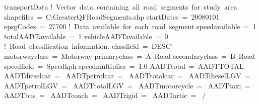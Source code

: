 \documentclass[letterpaper,10pt,english]{sphinxmanual}
\begin{document}
%
\begin{sphinxVerbatim}[commandchars=\\\{\}]
  \PYGZam{}transportData
    ! Vector data containing all road segments for study area
    shapefiles = \PYGZsq{}C:\PYGZbs{}GreaterQF\PYGZbs{}RoadSegments.shp\PYGZsq{}
    startDates = \PYGZsq{}2008\PYGZhy{}01\PYGZhy{}01\PYGZsq{}
    epsgCodes = 27700
    ! Data available for each road segment
    speed\PYGZus{}available = 1
    total\PYGZus{}AADT\PYGZus{}available = 1
    vehicle\PYGZus{}AADT\PYGZus{}available = 0
    ! Road classification information.
    class\PYGZus{}field = \PYGZsq{}DESC\PYGZus{}’
    motorway\PYGZus{}class = \PYGZsq{}Motorway\PYGZsq{}
    primary\PYGZus{}class = \PYGZsq{}A Road\PYGZsq{}
    secondary\PYGZus{}class = \PYGZsq{}B Road\PYGZsq{}
    speed\PYGZus{}field = \PYGZsq{}Speed\PYGZus{}kph\PYGZsq{}
    speed\PYGZus{}multiplier = 1.0
    AADT\PYGZus{}total = \PYGZsq{}AADTTOTAL\PYGZsq{}
    AADT\PYGZus{}diesel\PYGZus{}car = \PYGZsq{}\PYGZsq{}
    AADT\PYGZus{}petrol\PYGZus{}car = \PYGZsq{}\PYGZsq{}
    AADT\PYGZus{}total\PYGZus{}car = \PYGZsq{}\PYGZsq{}
    AADT\PYGZus{}diesel\PYGZus{}LGV = \PYGZsq{}\PYGZsq{}
    AADT\PYGZus{}petrol\PYGZus{}LGV = \PYGZsq{}\PYGZsq{}
    AADT\PYGZus{}total\PYGZus{}LGV = \PYGZsq{}\PYGZsq{}
    AADT\PYGZus{}motorcycle = \PYGZsq{}\PYGZsq{}
    AADT\PYGZus{}taxi = \PYGZsq{}\PYGZsq{}
    AADT\PYGZus{}bus = \PYGZsq{}\PYGZsq{}
    AADT\PYGZus{}coach = \PYGZsq{}\PYGZsq{}
    AADT\PYGZus{}rigid = \PYGZsq{}\PYGZsq{}
    AADT\PYGZus{}artic = \PYGZsq{}\PYGZsq{}
/
\end{sphinxVerbatim}

\end{document}
